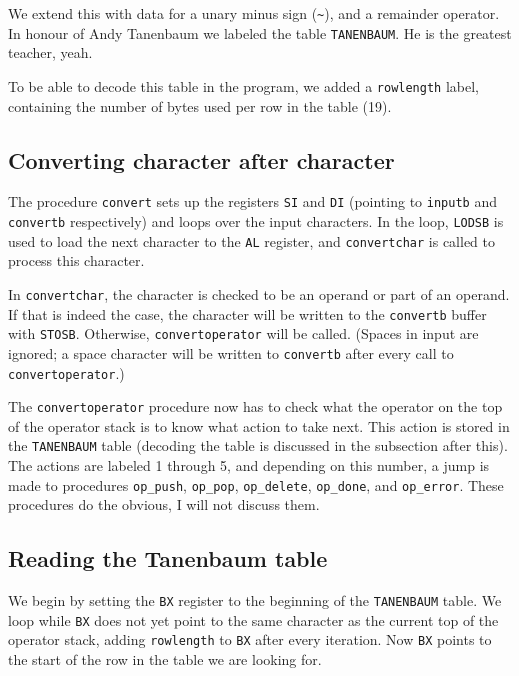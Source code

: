 \documentclass[11pt]{article}
\begin{document}
We extend this with data for a unary minus sign (\verb|~|), and a remainder operator. In honour of Andy Tanenbaum we labeled the table \verb|TANENBAUM|. He is the greatest teacher, yeah.

To be able to decode this table in the program, we added a \verb|rowlength| label, containing the number of bytes used per row in the table (19).

\subsection{Converting character after character}

The procedure \verb|convert| sets up the registers \verb|SI| and \verb|DI| (pointing to \verb|inputb| and \verb|convertb| respectively) and loops over the input characters. In the loop, \verb|LODSB| is used to load the next character to the \verb|AL| register, and \verb|convertchar| is called to process this character.

In \verb|convertchar|, the character is checked to be an operand or part of an operand. If that is indeed the case, the character will be written to the \verb|convertb| buffer with \verb|STOSB|. Otherwise, \verb|convertoperator| will be called. (Spaces in input are ignored; a space character will be written to \verb|convertb| after every call to \verb|convertoperator|.)

The \verb|convertoperator| procedure now has to check what the operator on the top of the operator stack is to know what action to take next. This action is stored in the \verb|TANENBAUM| table (decoding the table is discussed in the subsection after this). The actions are labeled 1 through 5, and depending on this number, a jump is made to procedures \verb|op_push|, \verb|op_pop|, \verb|op_delete|, \verb|op_done|, and \verb|op_error|. These procedures do the obvious, I will not discuss them.

\subsection{Reading the Tanenbaum table}

We begin by setting the \verb|BX| register to the beginning of the \verb|TANENBAUM| table. We loop while \verb|BX| does not yet point to the same character as the current top of the operator stack, adding \verb|rowlength| to \verb|BX| after every iteration. Now \verb|BX| points to the start of the row in the table we are looking for.
\end{document}

